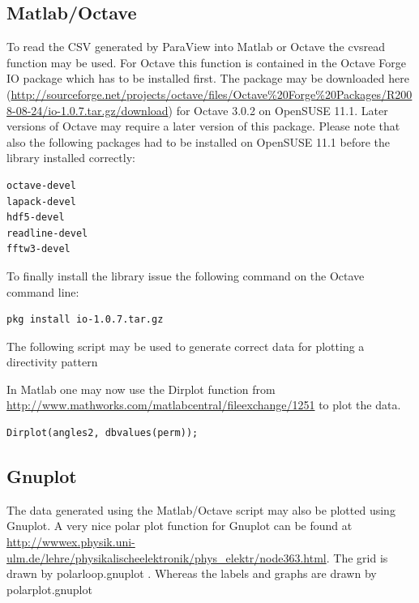 \subsection{Matlab/Octave}

To  read the  CSV generated  by  ParaView into  Matlab or  Octave the  cvsread
function may  be used.  For  Octave this function  is contained in  the Octave
Forge  IO  package which  has  to  be installed  first.   The  package may  be
downloaded                                                                 here
(\url{http://sourceforge.net/projects/octave/files/Octave%20Forge%20Packages/R2008-08-24/io-1.0.7.tar.gz/download})
for Octave  3.0.2 on  OpenSUSE 11.1.  Later versions of  Octave may  require a
later version  of this package. Please  note that also  the following packages
had to be installed on OpenSUSE 11.1 before the library installed correctly:

\begin{verbatim}
octave-devel
lapack-devel
hdf5-devel
readline-devel
fftw3-devel
\end{verbatim}

To  finally install  the library  issue the  following command  on  the Octave
command line:
\begin{verbatim}
pkg install io-1.0.7.tar.gz
\end{verbatim}

The  following script  may be  used to  generate correct  data for  plotting a
directivity  pattern 

In    Matlab    one    may    now    use    the    Dirplot    function    from
\url{http://www.mathworks.com/matlabcentral/fileexchange/1251}   to  plot  the
data.
\begin{verbatim}
Dirplot(angles2, dbvalues(perm));
\end{verbatim}

\subsection{Gnuplot}

The data  generated using the Matlab/Octave  script may also  be plotted using
Gnuplot.   A  very nice  polar  plot  function for  Gnuplot  can  be found  at
\url{http://wwwex.physik.uni-ulm.de/lehre/physikalischeelektronik/phys_elektr/node363.html}. The
grid            is            drawn            by            polarloop.gnuplot
.  Whereas
the     labels     and    graphs     are     drawn    by     polarplot.gnuplot
